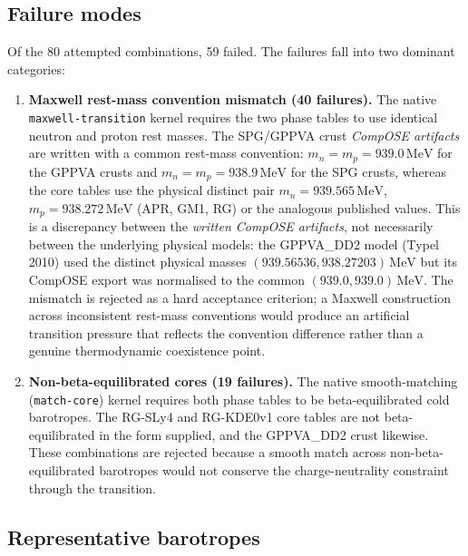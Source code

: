 \documentclass[aps,prc,reprint,notitlepage]{revtex4-2}
\begin{document}
\subsection{Failure modes}

Of the 80 attempted combinations, 59 failed.  The failures fall into two
dominant categories:

\begin{enumerate}
    \item \textbf{Maxwell rest-mass convention mismatch (40 failures).}  The
          native \texttt{maxwell-transition} kernel requires the two phase
          tables to use identical neutron and proton rest masses.  The
          SPG/GPPVA crust \emph{CompOSE artifacts} are written with a common
          rest-mass convention: $m_n = m_p = 939.0\,\mathrm{MeV}$ for the
          GPPVA crusts and $m_n = m_p = 938.9\,\mathrm{MeV}$ for the SPG
          crusts, whereas the core tables use the physical distinct pair
          $m_n = 939.565\,\mathrm{MeV}$, $m_p = 938.272\,\mathrm{MeV}$
          (APR, GM1, RG) or the analogous published values.  This is a
          discrepancy between the \emph{written CompOSE artifacts}, not
          necessarily between the underlying physical models: the GPPVA\_DD2
          model (Typel 2010) used the distinct physical masses
          $(939.56536, 938.27203)\,\mathrm{MeV}$ but its CompOSE export was
          normalised to the common $(939.0, 939.0)\,\mathrm{MeV}$.  The
          mismatch is rejected as a hard acceptance criterion; a Maxwell
          construction across inconsistent rest-mass conventions would
          produce an artificial transition
          pressure that reflects the convention difference rather than a
          genuine thermodynamic coexistence point.
    \item \textbf{Non-beta-equilibrated cores (19 failures).}  The native
          smooth-matching (\texttt{match-core}) kernel requires both phase
          tables to be beta-equilibrated cold barotropes.  The RG-SLy4 and
          RG-KDE0v1 core tables are not beta-equilibrated in the form
          supplied, and the GPPVA\_DD2 crust likewise.  These combinations
          are rejected because a smooth match across non-beta-equilibrated
          barotropes would not conserve the charge-neutrality constraint
          through the transition.
\end{enumerate}

\subsection{Representative barotropes}
\end{document}
